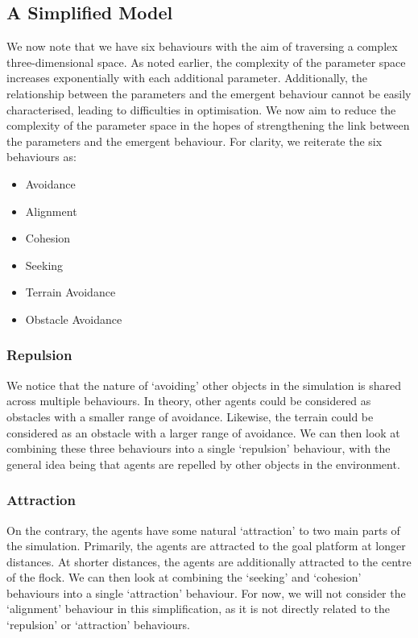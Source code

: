\documentclass[12pt]{article}
\begin{document}
\subsection{A Simplified Model}
We now note that we have six behaviours with the aim of traversing a complex three-dimensional space. As noted earlier, the complexity of the parameter space increases exponentially with each additional parameter. Additionally, the relationship between the parameters and the emergent behaviour cannot be easily characterised, leading to difficulties in optimisation. We now aim to reduce the complexity of the parameter space in the hopes of strengthening the link between the parameters and the emergent behaviour. For clarity, we reiterate the six behaviours as:

\begin{itemize}
    \item Avoidance
    \item Alignment
    \item Cohesion
    \item Seeking
    \item Terrain Avoidance
    \item Obstacle Avoidance
\end{itemize}

\subsubsection{Repulsion}
We notice that the nature of `avoiding' other objects in the simulation is shared across multiple behaviours. In theory, other agents could be considered as obstacles with a smaller range of avoidance. Likewise, the terrain could be considered as an obstacle with a larger range of avoidance. We can then look at combining these three behaviours into a single `repulsion' behaviour, with the general idea being that agents are repelled by other objects in the environment.

\subsubsection{Attraction}
On the contrary, the agents have some natural `attraction' to two main parts of the simulation. Primarily, the agents are attracted to the goal platform at longer distances. At shorter distances, the agents are additionally attracted to the centre of the flock. We can then look at combining the `seeking' and `cohesion' behaviours into a single `attraction' behaviour. For now, we will not consider the `alignment' behaviour in this simplification, as it is not directly related to the `repulsion' or `attraction' behaviours.
\end{document}
